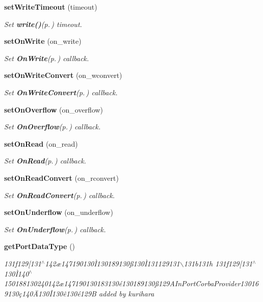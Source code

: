 \begin{CompactItemize}
{\bf set\-Write\-Timeout} (timeout)
\begin{CompactList}\small\item\em Set {\bf write()}{\rm (p.\,\pageref{classOutPort_OutPorta2})} timeout. \item\end{CompactList}\item 
{\bf set\-On\-Write} (on\_\-write)
\begin{CompactList}\small\item\em Set {\bf On\-Write}{\rm (p.\,\pageref{classOnWrite})} callback. \item\end{CompactList}\item 
{\bf set\-On\-Write\-Convert} (on\_\-wconvert)
\begin{CompactList}\small\item\em Set {\bf On\-Write\-Convert}{\rm (p.\,\pageref{classOnWriteConvert})} callback. \item\end{CompactList}\item 
{\bf set\-On\-Overflow} (on\_\-overflow)
\begin{CompactList}\small\item\em Set {\bf On\-Overflow}{\rm (p.\,\pageref{classOnOverflow})} callback. \item\end{CompactList}\item 
{\bf set\-On\-Read} (on\_\-read)
\begin{CompactList}\small\item\em Set {\bf On\-Read}{\rm (p.\,\pageref{classOnRead})} callback. \item\end{CompactList}\item 
{\bf set\-On\-Read\-Convert} (on\_\-rconvert)
\begin{CompactList}\small\item\em Set {\bf On\-Read\-Convert}{\rm (p.\,\pageref{classOnReadConvert})} callback. \item\end{CompactList}\item 
{\bf set\-On\-Underflow} (on\_\-underflow)
\begin{CompactList}\small\item\em Set {\bf On\-Underflow}{\rm (p.\,\pageref{classOnUnderflow})} callback. \item\end{CompactList}\item 
{\bf get\-Port\-Data\-Type} ()
\begin{CompactList}\small\item\em 131f129[131$^\wedge$142\ae{}147190130\`{I}130189130\ss{}130\`{I}131129131$\backslash$131b131h 131f129[131$^\wedge$130\`{I}140$^\wedge$150188130240142\ae{}147190130183130\'{e}130189130\ss{}129AIn\-Port\-Corba\-Provider130169130\c{c}140\"{A}130\^{I}130\^{e}130\'{e}129B added by kurihara \item\end{CompactList}\end{CompactItemize}


